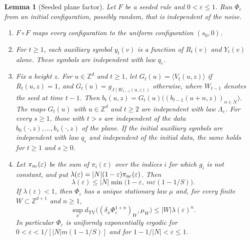 \documentclass[11pt]{article}
\theoremstyle{plain}
\newtheorem{lemma}[theorem]{Lemma}
\theoremstyle{definition}
\theoremstyle{remark}
\newcommand{\Z}{\mathbb Z}
\newcommand{\eps}{\varepsilon}
\newcommand{\dtv}{d_{\mathrm{TV}}}
\begin{document}
\begin{lemma}[Seeded plane factor]\label{lem:seeded}
Let $F$ be a seeded rule and $0<\eps\leq1$. Run $\Phi_\eps$ from an initial configuration, possibly random, that is independent of the noise.
\begin{enumerate}[label=\textup{(\roman*)}]
\item $F\circ F$ maps every configuration to the uniform configuration $(s_0,0)$.
\item For $t\geq1$, each auxiliary symbol $y_t(v)$ is a function of $R_t(v)$ and $Y_t(v)$ alone. These symbols are independent with law $q_\eps$.
\item Fix a height $z$. For $u\in\Z^d$ and $t\geq1$, let $G_t(u)=\langle V_t(u,z)\rangle$ if $R_t(u,z)=1$, and $G_t(u)=g_{J(W_{t-1}(u,z))}$ otherwise, where $W_{t-1}$ denotes the seed at time $t-1$. Then $b_t(u,z)=G_t(u)\bigl((b_{t-1}(u+n,z))_{n\in N}\bigr)$. The maps $G_t(u)$ with $u\in\Z^d$ and $t\geq2$ are independent with law $\Lambda_\eps$. For every $s\geq1$, those with $t>s$ are independent of the data $b_0(\cdot,z),\ldots,b_s(\cdot,z)$ of the plane. If the initial auxiliary symbols are independent with law $q_\eps$ and independent of the initial data, the same holds for $t\geq1$ and $s\geq0$.
\item Let $\pi_{\rm nc}(\eps)$ be the sum of $\pi_i(\eps)$ over the indices $i$ for which $g_i$ is not constant, and put $\lambda(\eps)=|N|(1-\eps)\pi_{\rm nc}(\eps)$. Then
\begin{equation}\label{eq:seed-lambda}
 \lambda(\eps)\leq|N|\min\bigl(1-\eps,\ m\eps(1-1/S)\bigr).
\end{equation}
If $\lambda(\eps)<1$, then $\Phi_\eps$ has a unique stationary law $\mu$ and, for every finite $W\subset\Z^{d+1}$ and $n\geq1$,
\begin{equation}\label{eq:seed-coupling}
 \sup_x\dtv\bigl((\delta_x\Phi_\eps^{1+n})_W,\mu_W\bigr)\leq|W|\lambda(\eps)^n .
\end{equation}
In particular $\Phi_\eps$ is uniformly exponentially ergodic for $0<\eps<1/[|N|m(1-1/S)]$ and for $1-1/|N|<\eps\leq1$.
\end{enumerate}
\end{lemma}
\end{document}
